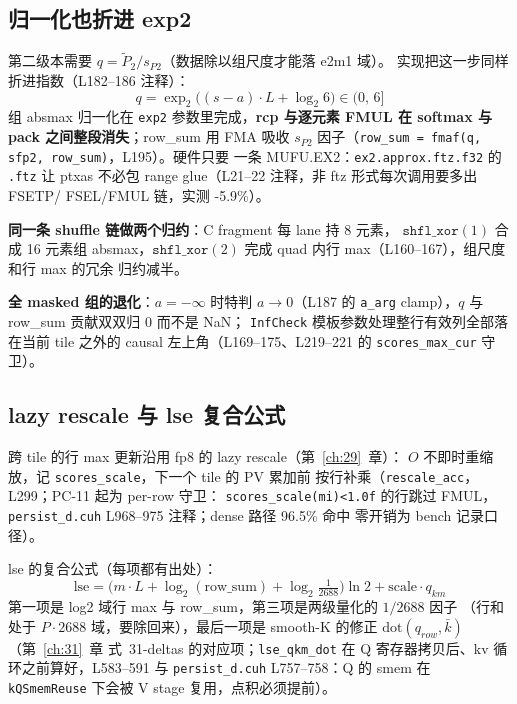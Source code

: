\subsection{归一化也折进 exp2}

第二级本需要 $q=\tilde P_2/s_{P2}$（数据除以组尺度才能落 e2m1 域）。
实现把这一步同样折进指数（L182--186 注释）：
\begin{equation}
  q=\exp_2\!\bigl((s-a)\cdot L+\log_2 6\bigr)\in(0,\,6]
\end{equation}
组 absmax 归一化在 \texttt{exp2} 参数里完成，\textbf{rcp 与逐元素
FMUL 在 softmax 与 pack 之间整段消失}；row\_sum 用 FMA 吸收 $s_{P2}$
因子（\texttt{row\_sum = fmaf(q, sfp2, row\_sum)}，L195）。硬件只要
一条 MUFU.EX2：\texttt{ex2.approx.ftz.f32} 的 \texttt{.ftz} 让 ptxas
不必包 range glue（L21--22 注释，非 ftz 形式每次调用要多出 FSETP/
FSEL/FMUL 链，实测 -5.9\%）。

\textbf{同一条 shuffle 链做两个归约}：C fragment 每 lane 持 8 元素，
$\texttt{shfl\_xor}(1)$ 合成 16 元素组 absmax，$\texttt{shfl\_xor}(2)$
完成 quad 内行 max（L160--167），组尺度和行 max 的冗余
归约减半。

\textbf{全 masked 组的退化}：$a=-\infty$ 时特判 $a\to0$（L187 的
\texttt{a\_arg} clamp），$q$ 与 row\_sum 贡献双双归 0 而不是 NaN；
\texttt{InfCheck} 模板参数处理整行有效列全部落在当前 tile 之外的
causal 左上角（L169--175、L219--221 的 \texttt{scores\_max\_cur} 守卫）。

\subsection{lazy rescale 与 lse 复合公式}

跨 tile 的行 max 更新沿用 fp8 的 lazy rescale（第~\ref{ch:29}~章）：
$O$ 不即时重缩放，记 \texttt{scores\_scale}，下一个 tile 的 PV 累加前
按行补乘（\texttt{rescale\_acc}，L299；PC-11 起为 per-row 守卫：
\texttt{scores\_scale(mi)<1.0f} 的行跳过 FMUL，
\texttt{persist\_d.cuh} L968--975 注释；dense 路径 96.5\% 命中
零开销为 bench 记录口径）。

lse 的复合公式（每项都有出处）：
\begin{equation}
  \mathrm{lse}=\bigl(m\cdot L+\log_2(\mathrm{row\_sum})+
  \log_2\tfrac{1}{2688}\bigr)\ln 2+\mathrm{scale}\cdot q_{km}
  \label{eq:32-lse}
\end{equation}
第一项是 log2 域行 max 与 row\_sum，第三项是两级量化的 $1/2688$ 因子
（行和处于 $P\cdot2688$ 域，要除回来），最后一项是 smooth-K 的修正
$\mathrm{dot}(q_{row},\bar k)$（第~\ref{ch:31}~章
式~31-deltas 的对应项；\texttt{lse\_qkm\_dot} 在 Q 寄存器拷贝后、kv
循环之前算好，L583--591 与 \texttt{persist\_d.cuh} L757--758：Q 的
smem 在 \texttt{kQSmemReuse} 下会被 V stage 复用，点积必须提前）。

